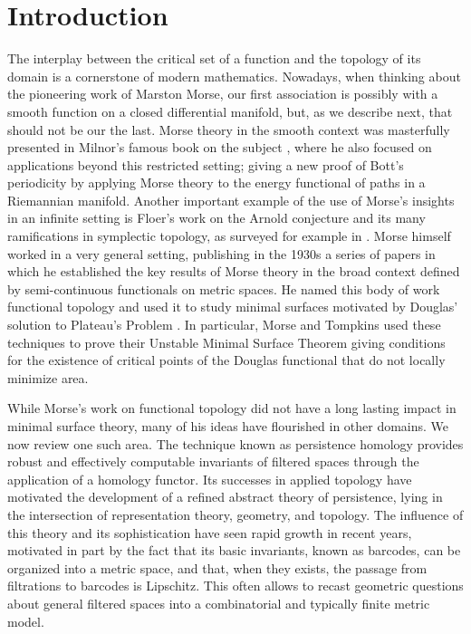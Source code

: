 
\section{Introduction}

The interplay between the critical set of a function and the topology of its domain is a cornerstone of modern mathematics.
Nowadays, when thinking about the pioneering work of Marston Morse, our first association is possibly with a smooth function on a closed differential manifold, but, as we describe next, that should not be our the last.
Morse theory in the smooth context was masterfully presented in Milnor's famous book on the subject \cite{MR0163331}, where he also focused on applications beyond this restricted setting;
giving a new proof of Bott's periodicity by applying Morse theory to the energy functional of paths in a Riemannian manifold.
Another important example of the use of Morse's insights in an infinite setting is Floer's work on the Arnold conjecture and its many ramifications in symplectic topology, as surveyed for example in \cite{MR1702944}.
Morse himself worked in a very general setting, publishing in the 1930s a series of papers \cite{Morse.1937, Morse.1938, Morse.1940, MR9102} in which he established the key results of Morse theory in the broad context defined by semi-continuous functionals on metric spaces.
He named this body of work functional topology and used it to study minimal surfaces motivated by Douglas' solution to Plateau’s Problem \cite{Douglas.1931}.
In particular, Morse and Tompkins \cite{Morse.1939, Morse.1941} used these techniques to prove their Unstable Minimal Surface Theorem giving conditions for the existence of critical points of the Douglas functional that do not locally minimize area.

While Morse's work on functional topology did not have a long lasting impact in minimal surface theory, many of his ideas have flourished in other domains.
We now review one such area.
The technique known as persistence homology provides robust and effectively computable invariants of filtered spaces through the application of a homology functor.
Its successes in applied topology have motivated the development of a refined abstract theory of persistence, lying in the intersection of representation theory, geometry, and topology.
The influence of this theory and its sophistication have seen rapid growth in recent years, motivated in part by the fact that
its basic invariants, known as barcodes, can be organized into a metric space, and that, when they exists, the passage from filtrations to barcodes is Lipschitz.
This often allows to recast geometric questions about general filtered spaces into a combinatorial and typically finite metric model.

